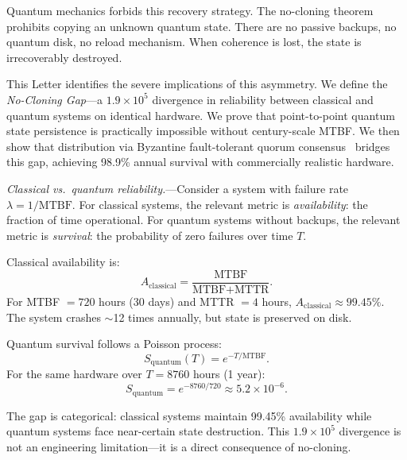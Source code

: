 \documentclass[aps,prl,twocolumn,superscriptaddress,showpacs]{revtex4-2}
\begin{document}
Quantum mechanics forbids this recovery strategy. The no-cloning theorem~\cite{wootters1982,dieks1982} prohibits copying an unknown quantum state. There are no passive backups, no quantum disk, no reload mechanism. When coherence is lost, the state is irrecoverably destroyed.

This Letter identifies the severe implications of this asymmetry. We define the \textit{No-Cloning Gap}—a $1.9 \times 10^5$ divergence in reliability between classical and quantum systems on identical hardware. We prove that point-to-point quantum state persistence is practically impossible without century-scale MTBF. We then show that distribution via Byzantine fault-tolerant quorum consensus~\cite{lamport1982,castro1999} bridges this gap, achieving 98.9\% annual survival with commercially realistic hardware.


\textit{Classical vs.\ quantum reliability.}—Consider a system with failure rate $\lambda = 1/\text{MTBF}$. For classical systems, the relevant metric is \textit{availability}: the fraction of time operational. For quantum systems without backups, the relevant metric is \textit{survival}: the probability of zero failures over time $T$.

Classical availability is:
\begin{equation}
A_{\text{classical}} = \frac{\text{MTBF}}{\text{MTBF} + \text{MTTR}}.
\end{equation}
For MTBF $= 720$ hours (30 days) and MTTR $= 4$ hours, $A_{\text{classical}} \approx 99.45\%$. The system crashes $\sim$12 times annually, but state is preserved on disk.

Quantum survival follows a Poisson process:
\begin{equation}
S_{\text{quantum}}(T) = e^{-T/\text{MTBF}}.
\end{equation}
For the same hardware over $T = 8760$ hours (1 year):
\begin{equation}
S_{\text{quantum}} = e^{-8760/720} \approx 5.2 \times 10^{-6}.
\end{equation}

The gap is categorical: classical systems maintain 99.45\% availability while quantum systems face near-certain state destruction. This $1.9 \times 10^5$ divergence is not an engineering limitation—it is a direct consequence of no-cloning.
\end{document}
